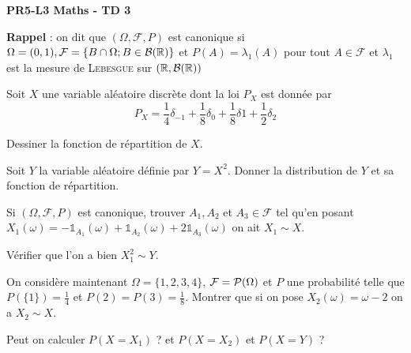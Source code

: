 \documentclass{report}
\begin{document}
\begin{center}
    \Huge{\textbf{PR5-L3 Maths - TD 3}}
\end{center}
\bigskip

\textbf{Rappel} : on dit que \(\left( \Omega,\mathcal{F}, P\right)\) est
canonique si \(\Omega=(0,1),\mathcal{F}=\{B\cap\Omega;B\in\mathcal{B}(\mathbb{R})\}
\) et \(P(A)=\lambda_1(A)\) pour tout \(A\in\mathcal{F}\) et \(\lambda_1\)
est la mesure de \textsc{Lebesgue} sur \(\left(\mathbb{R},\mathcal{B}(\mathbb{R})\right)\)

\begin{exo}
    Soit \(X\) une variable aléatoire discrète dont la loi \(P_X\) est
    donnée par \[P_X=\frac14\delta_{-1}+\frac18\delta_0+\frac18\delta1
    +\frac12\delta_2\]
    \begin{q}{1}
        Dessiner la fonction de répartition de \(X\).
    \end{q}
    \begin{q}{2}
        Soit \(Y\) la variable aléatoire définie par \(Y=X^2\). Donner
        la distribution de \(Y\) et sa fonction de répartition.
    \end{q}
    \begin{q}{3}
        Si \(\left(\Omega, \mathcal{F},P\right)\) est canonique, trouver
        \(A_1, A_2\) et \(A_3\in\mathcal{F}\) tel qu'en posant \(X_1(\omega)
        =-\mathds{1}_{A_1}(\omega)+\mathds{1}_{A_2}(\omega)+ 2\mathds{1}_{A_3}
        (\omega)\) on ait \(X_1\sim X\).
        \boxans{On choisit par exemple \(A_1=(0,\frac14], A_2=(\frac38,\frac12]\)
        et \(A_3=(\frac12, 1)\) donnant bien \(X_1\sim X\)}
    \end{q}
    \begin{q}{4}
        Vérifier que l'on a bien \(X_1^2\sim Y\).
    \end{q}
    \begin{q}{5}
        On considère maintenant \(\Omega=\{1,2,3,4\}\), \(\mathcal{F}=\mathcal{P}(\Omega)\)
        et \(P\) une probabilité telle que \(P(\{1\})=\frac14\) et
        \(P({2})=P({3})= \frac18\). Montrer que si on pose \(X_2(\omega)=\omega - 2\)
        on a \(X_2\sim X\).
    \end{q}
    \begin{q}{6}
        Peut on calculer \(P(X=X_1)\) ? et \(P(X=X_2)\) et \(P(X=Y)\) ?
    \end{q}
\end{exo}
\end{document}
